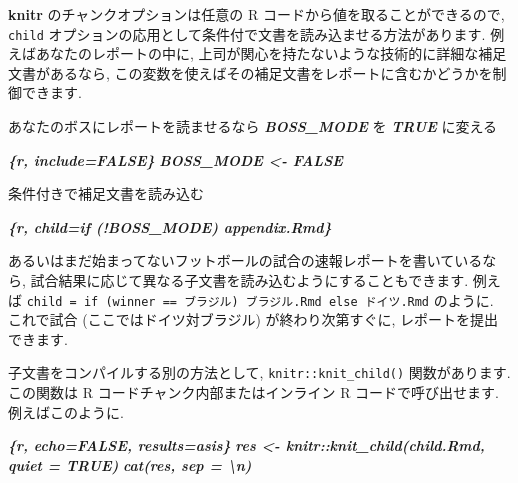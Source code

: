 \documentclass[
  11pt,
  lualatex,ja=standard,jafont=noto]{bxjsreport}
\newenvironment{Shaded}{\begin{snugshade}}{\end{snugshade}}
\newcommand{\InformationTok}[1]{\textcolor[rgb]{0.56,0.35,0.01}{\textbf{\textit{#1}}}}
\newcommand{\NormalTok}[1]{#1}
\begin{document}
\textbf{knitr} のチャンクオプションは任意の R コードから値を取ることができるので, \texttt{child} オプションの応用として条件付で文書を読み込ませる方法があります. 例えばあなたのレポートの中に, 上司が関心を持たないような技術的に詳細な補足文書があるなら, この変数を使えばその補足文書をレポートに含むかどうかを制御できます.

\begin{Shaded}
\begin{Highlighting}[]
\NormalTok{あなたのボスにレポートを読ませるなら }\InformationTok{\textasciigrave{}BOSS\_MODE\textasciigrave{}}\NormalTok{ を }\InformationTok{\textasciigrave{}TRUE\textasciigrave{}}\NormalTok{ に変える}

\InformationTok{\textasciigrave{}\textasciigrave{}\textasciigrave{}\{r, include=FALSE\}}
\InformationTok{BOSS\_MODE \textless{}{-} FALSE}
\InformationTok{\textasciigrave{}\textasciigrave{}\textasciigrave{}}

\NormalTok{条件付きで補足文書を読み込む}

\InformationTok{\textasciigrave{}\textasciigrave{}\textasciigrave{}\{r, child=if (!BOSS\_MODE) \textquotesingle{}appendix.Rmd\textquotesingle{}\}}
\InformationTok{\textasciigrave{}\textasciigrave{}\textasciigrave{}}
\end{Highlighting}
\end{Shaded}

あるいはまだ始まってないフットボールの試合の速報レポートを書いているなら, 試合結果に応じて異なる子文書を読み込むようにすることもできます. 例えば \texttt{child = if (winner == \textquotesingle{}ブラジル\textquotesingle{})\ \textquotesingle{}ブラジル.Rmd\textquotesingle{}\ else\ \textquotesingle{}ドイツ.Rmd\textquotesingle{}} のように. これで試合 (ここではドイツ対ブラジル) が終わり次第すぐに, レポートを提出できます.

子文書をコンパイルする別の方法として, \texttt{knitr::knit\_child()} 関数があります. この関数は R コードチャンク内部またはインライン R コードで呼び出せます. 例えばこのように.

\begin{Shaded}
\begin{Highlighting}[]
\InformationTok{\textasciigrave{}\textasciigrave{}\textasciigrave{}\{r, echo=FALSE, results=\textquotesingle{}asis\textquotesingle{}\}}
\InformationTok{res \textless{}{-} knitr::knit\_child(\textquotesingle{}child.Rmd\textquotesingle{}, quiet = TRUE)}
\InformationTok{cat(res, sep = \textquotesingle{}\textbackslash{}n\textquotesingle{})}
\InformationTok{\textasciigrave{}\textasciigrave{}\textasciigrave{}}
\end{Highlighting}
\end{Shaded}
\end{document}
